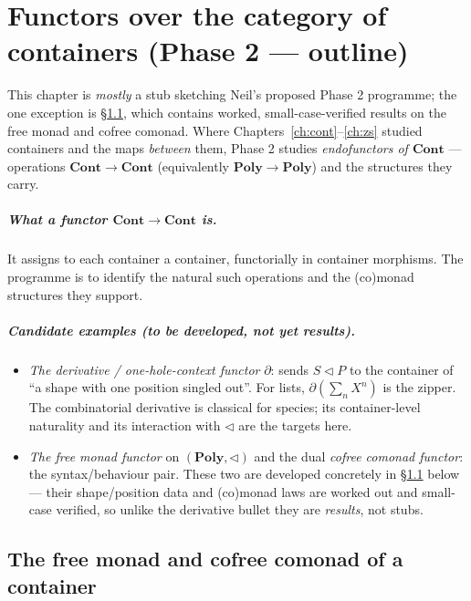 \documentclass[11pt,a4paper]{book}
\newcommand{\Cont}{\mathbf{Cont}}
\newcommand{\Poly}{\mathbf{Poly}}
\newcommand{\cont}[2]{#1 \triangleleft #2}
\theoremstyle{plain}
\theoremstyle{definition}
\theoremstyle{remark}
\begin{document}
\chapter{Functors over the category of containers (Phase 2 --- outline)}
\label{ch:phase2}

This chapter is \emph{mostly} a stub sketching Neil's proposed Phase 2 programme; the one
exception is \S\ref{sec:freecofree}, which contains worked, small-case-verified results on the
free monad and cofree comonad. Where Chapters~\ref{ch:cont}--\ref{ch:zs} studied containers
and the maps \emph{between} them, Phase 2 studies \emph{endofunctors of $\Cont$}
--- operations $\Cont\to\Cont$ (equivalently $\Poly\to\Poly$) and the structures
they carry.

\paragraph{What a functor $\Cont\to\Cont$ is.} It assigns to each container a
container, functorially in container morphisms. The programme is to identify the
natural such operations and the (co)monad structures they support.

\paragraph{Candidate examples (to be developed, not yet results).}
\begin{itemize}[nosep]
  \item \emph{The derivative / one-hole-context functor} $\partial$: sends
        $\cont SP$ to the container of ``a shape with one position singled out''.
        For lists, $\partial(\sum_n X^n)$ is the zipper. The combinatorial
        derivative is classical for species; its container-level naturality and
        its interaction with $\triangleleft$ are the targets here.
  \item \emph{The free monad functor} on $(\Poly,\triangleleft)$ and the dual
        \emph{cofree comonad functor}: the syntax/behaviour pair. These two are
        developed concretely in \S\ref{sec:freecofree} below --- their shape/position
        data and (co)monad laws are worked out and small-case verified, so unlike the
        derivative bullet they are \emph{results}, not stubs.
\end{itemize}

\section{The free monad and cofree comonad of a container}
\label{sec:freecofree}
\end{document}
